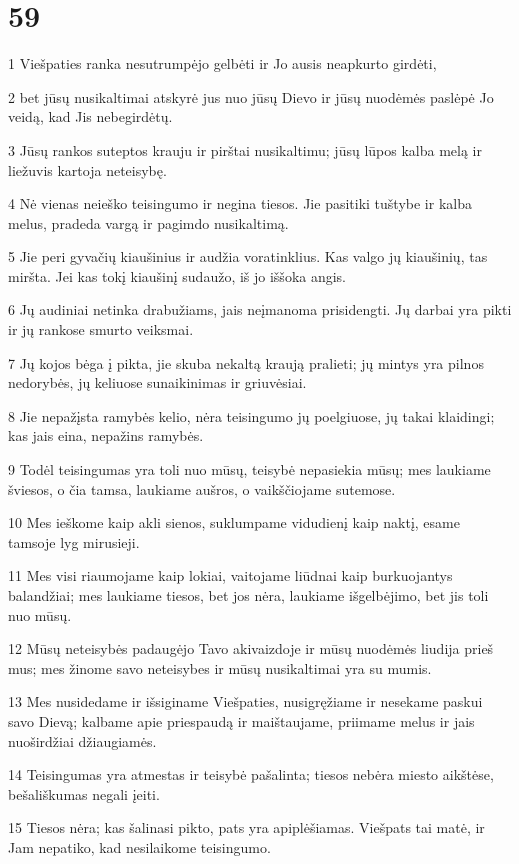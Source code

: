 \chapter{59}


\par 1 Viešpaties ranka nesutrumpėjo gelbėti ir Jo ausis neapkurto girdėti, 
\par 2 bet jūsų nusikaltimai atskyrė jus nuo jūsų Dievo ir jūsų nuodėmės paslėpė Jo veidą, kad Jis nebegirdėtų. 
\par 3 Jūsų rankos suteptos krauju ir pirštai nusikaltimu; jūsų lūpos kalba melą ir liežuvis kartoja neteisybę. 
\par 4 Nė vienas neieško teisingumo ir negina tiesos. Jie pasitiki tuštybe ir kalba melus, pradeda vargą ir pagimdo nusikaltimą. 
\par 5 Jie peri gyvačių kiaušinius ir audžia voratinklius. Kas valgo jų kiaušinių, tas miršta. Jei kas tokį kiaušinį sudaužo, iš jo iššoka angis. 
\par 6 Jų audiniai netinka drabužiams, jais neįmanoma prisidengti. Jų darbai yra pikti ir jų rankose smurto veiksmai. 
\par 7 Jų kojos bėga į pikta, jie skuba nekaltą kraują pralieti; jų mintys yra pilnos nedorybės, jų keliuose sunaikinimas ir griuvėsiai. 
\par 8 Jie nepažįsta ramybės kelio, nėra teisingumo jų poelgiuose, jų takai klaidingi; kas jais eina, nepažins ramybės. 
\par 9 Todėl teisingumas yra toli nuo mūsų, teisybė nepasiekia mūsų; mes laukiame šviesos, o čia tamsa, laukiame aušros, o vaikščiojame sutemose. 
\par 10 Mes ieškome kaip akli sienos, suklumpame vidudienį kaip naktį, esame tamsoje lyg mirusieji. 
\par 11 Mes visi riaumojame kaip lokiai, vaitojame liūdnai kaip burkuojantys balandžiai; mes laukiame tiesos, bet jos nėra, laukiame išgelbėjimo, bet jis toli nuo mūsų. 
\par 12 Mūsų neteisybės padaugėjo Tavo akivaizdoje ir mūsų nuodėmės liudija prieš mus; mes žinome savo neteisybes ir mūsų nusikaltimai yra su mumis. 
\par 13 Mes nusidedame ir išsiginame Viešpaties, nusigręžiame ir nesekame paskui savo Dievą; kalbame apie priespaudą ir maištaujame, priimame melus ir jais nuoširdžiai džiaugiamės. 
\par 14 Teisingumas yra atmestas ir teisybė pašalinta; tiesos nebėra miesto aikštėse, bešališkumas negali įeiti. 
\par 15 Tiesos nėra; kas šalinasi pikto, pats yra apiplėšiamas. Viešpats tai matė, ir Jam nepatiko, kad nesilaikome teisingumo. 
